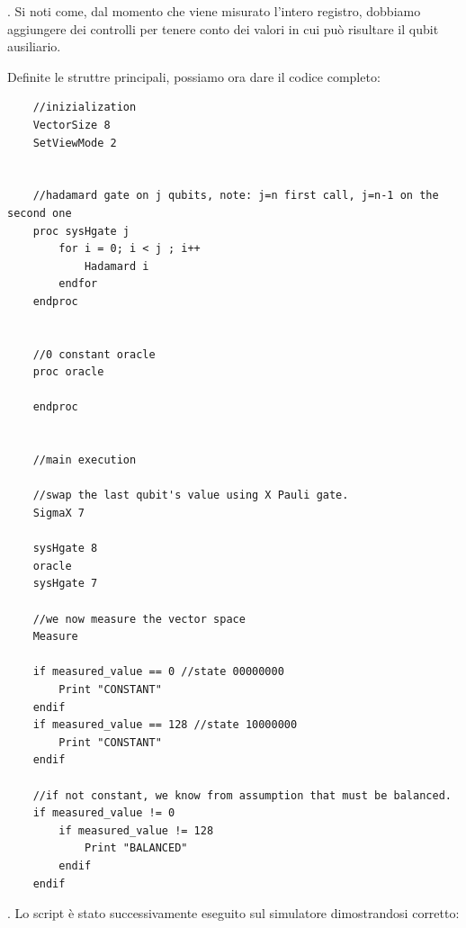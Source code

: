 \documentclass[12pt,a4paper,openright]{report}
\begin{document}
. Si noti come, dal momento che viene misurato l'intero registro, dobbiamo aggiungere dei controlli per tenere conto dei valori in cui può risultare il qubit ausiliario.

\newpage
Definite le struttre principali, possiamo ora dare il codice completo:

\begin{lstlisting}
    //inizialization
    VectorSize 8
    SetViewMode 2
    
    
    //hadamard gate on j qubits, note: j=n first call, j=n-1 on the second one
    proc sysHgate j
        for i = 0; i < j ; i++
            Hadamard i
        endfor
    endproc
    
    
    //0 constant oracle
    proc oracle

    endproc
    
    
    //main execution
    
    //swap the last qubit's value using X Pauli gate.
    SigmaX 7
    
    sysHgate 8
    oracle
    sysHgate 7
    
    //we now measure the vector space
    Measure
    
    if measured_value == 0 //state 00000000 
        Print "CONSTANT"
    endif
    if measured_value == 128 //state 10000000
        Print "CONSTANT"
    endif
    
    //if not constant, we know from assumption that must be balanced.
    if measured_value != 0
        if measured_value != 128
            Print "BALANCED"
        endif
    endif
    \end{lstlisting}

. Lo script è stato successivamente eseguito sul simulatore dimostrandosi corretto:
\end{document}
